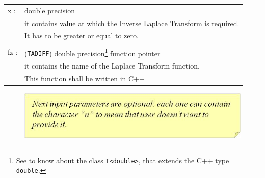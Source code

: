 \documentclass[10pt]{article}
\begin{document}
 \begin{center}

\begin{longtable}{ll}
x  :	&	double precision\\
        & it contains value at which the Inverse Laplace Transform is required. \\
	&It has to be greater or  equal to zero.\\
&\\
fz :    &    	({\tt TADIFF}) double precision\footnote{See \cite{2} to know about the class {\tt T<double>}, that extends the C++ type {\tt double}.}  function pointer\\
	&it contains the name of the Laplace Transform function.\\
	&This function shall be written in C++\\
 \end{longtable}

\begin{figure}[!h]
\begin{flushright}

\includegraphics[scale=0.8]{rel6}
\end{flushright}
\end{figure}


\end{center}
\end{document}
